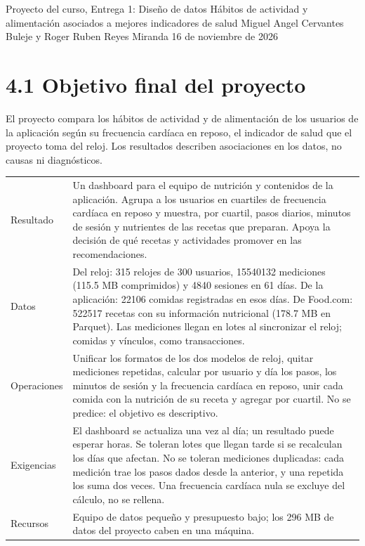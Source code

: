 \documentclass[11pt]{article}
\begin{document}
  {Proyecto del curso, Entrega 1: Diseño de datos}
  {Hábitos de actividad y alimentación asociados a mejores indicadores de salud}
  {Miguel Angel Cervantes Buleje y Roger Ruben Reyes Miranda}
  {16 de noviembre de 2026}


\section{4.1 Objetivo final del proyecto}

El proyecto compara los hábitos de actividad y de alimentación de los
usuarios de la aplicación según su frecuencia cardíaca en reposo, el indicador
de salud que el proyecto toma del reloj. Los resultados describen asociaciones
en los datos, no causas ni diagnósticos.

\begingroup\iniciartabla\small
\begin{tabularx}{\textwidth}{|L{2.3cm}|Y|}\hline
{} & \\\hline
Resultado & Un dashboard para el equipo de nutrición y contenidos de la
aplicación. Agrupa a los usuarios en cuartiles de frecuencia cardíaca en reposo
y muestra, por cuartil, pasos diarios, minutos de sesión y nutrientes de las
recetas que preparan. Apoya la decisión de qué recetas y actividades promover
en las recomendaciones.\\\hline
Datos & Del reloj: 315 relojes de 300 usuarios, 15540132 mediciones (115.5 MB
comprimidos) y 4840 sesiones en 61 días. De la aplicación: 22106 comidas
registradas en esos días. De Food.com: 522517 recetas con su información nutricional (178.7 MB en Parquet).
Las mediciones llegan en lotes al sincronizar el reloj; comidas y vínculos, como transacciones.\\\hline
Operaciones & Unificar los formatos de los dos modelos de reloj, quitar
mediciones repetidas, calcular por usuario y día los pasos, los minutos de
sesión y la frecuencia cardíaca en reposo, unir cada comida con la nutrición de
su receta y agregar por cuartil. No se predice: el objetivo es descriptivo.\\\hline
Exigencias & El dashboard se actualiza una vez al día; un resultado puede
esperar horas. Se toleran lotes que llegan tarde si se recalculan los días que
afectan. No se toleran mediciones duplicadas: cada medición trae los pasos dados desde
la anterior, y una repetida los suma dos veces. Una
frecuencia cardíaca nula se excluye del cálculo, no se rellena.\\\hline
Recursos & Equipo de datos pequeño y presupuesto bajo; los 296 MB de datos del proyecto caben en una máquina.\\\hline
\end{tabularx}
\endgroup
\end{document}
